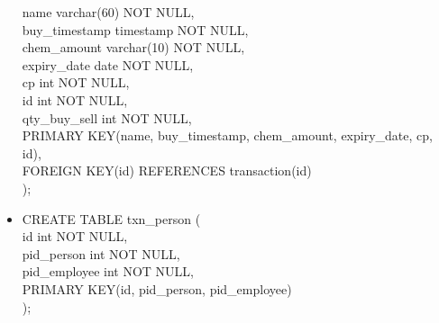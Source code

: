 \documentclass[a4papaer]{article}
\begin{document}
\begin{itemize}
			\hspace*{4mm}name varchar(60) NOT NULL,\\
			\hspace*{4mm}buy\_timestamp timestamp NOT NULL,\\
			\hspace*{4mm}chem\_amount varchar(10) NOT NULL,\\
			\hspace*{4mm}expiry\_date date NOT NULL,\\
			\hspace*{4mm}cp int NOT NULL,\\
			\hspace*{4mm}id int NOT NULL,\\
			\hspace*{4mm}qty\_buy\_sell int NOT NULL,\\
			\hspace*{4mm}PRIMARY KEY(name, buy\_timestamp, chem\_amount, expiry\_date, cp, id),\\
			\hspace*{4mm}FOREIGN KEY(id) REFERENCES transaction(id)\\
		);
		\item CREATE TABLE txn\_person (\\
			\hspace*{4mm}id int NOT NULL,\\
			\hspace*{4mm}pid\_person int NOT NULL,\\
			\hspace*{4mm}pid\_employee int NOT NULL,\\
			\hspace*{4mm}PRIMARY KEY(id, pid\_person, pid\_employee)\\
		);
	\end{itemize}
\end{document}
